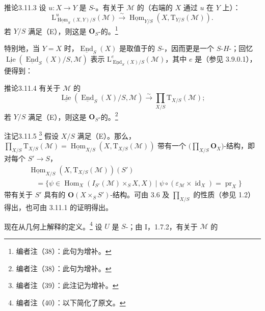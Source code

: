 \begin{SGAresult}{推论}{3.11.3}
设 $u:X\to Y$ 是 $S$-。有关于 $\mathcal M$ 的（右端的 $X$ 通过 $u$ 在 $Y$ 上）：
\[
\mathrm L^u_{\underline{\operatorname{Hom}}_S(X,Y)/S}(\mathcal M)
\xrightarrow\sim\underline{\operatorname{Hom}}_{Y/S}(X,\mathrm T_{Y/S}(\mathcal M)).
\]
若 $Y/S$ 满足（E），则这是 $\mathbf O_S$-的。\footnote{编者注（38）：此句为增补。}
\end{SGAresult}
特别地，当 $Y=X$ 时，$\underline{\operatorname{End}}_S(X)$ 是取值于的 $S$-，因而更是一个 $S$-$H$-；回忆 $\underline{\operatorname{Lie}}(\underline{\operatorname{End}}_S(X)/S,\mathcal M)$ 表示 $\mathrm L^e_{\underline{\operatorname{End}}_S(X)/S}(\mathcal M)$，其中 $e$ 是（参见 3.9.0.1），便得到：
\begin{SGAresult}{推论}{3.11.4}
有关于 $\mathcal M$ 的
\[
\underline{\operatorname{Lie}}(\underline{\operatorname{End}}_S(X)/S,\mathcal M)
\xrightarrow\sim\prod_{X/S}\mathrm T_{X/S}(\mathcal M);
\]
若 $Y/S$ 满足（E），则这是 $\mathbf O_S$-的。\footnote{编者注（38）：此句为增补。}
\end{SGAresult}
\begin{SGAresult}{注记}{3.11.5}
\footnote{编者注（39）：此注记为增补。} 假设 $X/S$ 满足（E）。那么，$\prod_{X/S}\mathrm T_{X/S}(\mathcal M)=\underline{\operatorname{Hom}}_{X/S}(X,\mathrm T_{X/S}(\mathcal M))$ 带有一个 $\bigl(\prod_{X/S}\mathbf O_X\bigr)$-结构，即对每个 $S'\to S$，
\[
\begin{aligned}
{}&\underline{\operatorname{Hom}}_{X/S}(X,\mathrm T_{X/S}(\mathcal M))(S')\\
&\quad=\{\psi\in\operatorname{Hom}_X(I_{S'}(\mathcal M)\times_S X,X)
\mid\psi\circ(\varepsilon_{\mathcal M}\times\operatorname{id}_X)=\operatorname{pr}_X\}
\end{aligned}
\]
带有关于 $S'$ 具有的 $\mathbf O(X\times_S S')$-结构。可由 3.6 及 $\prod_{X/S}$ 的性质（参见 1.2）得出，也可由 3.11.1 的证明得出。
\end{SGAresult}
现在从几何上解释的定义。\footnote{编者注（40）：以下简化了原文。} 设 $U$ 是 $S$-；由 I，1.7.2，有关于 $\mathcal M$ 的
